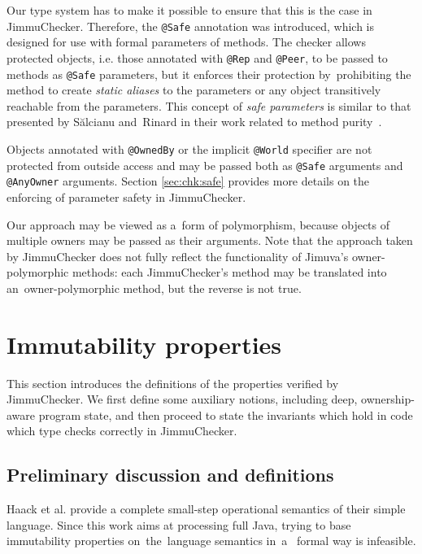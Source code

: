 \documentclass{pracamgr}
\theoremstyle{break}
\theoremstyle{break}
\theoremstyle{break}
\begin{document}
Our type system has to make it possible to ensure that this is the
case in JimmuChecker. Therefore, the \texttt{@Safe} annotation was
introduced, which is designed for use with formal parameters of
methods. The checker allows protected objects, i.e. those annotated
with \texttt{@Rep} and \texttt{@Peer}, to be passed to methods as
\texttt{@Safe} parameters, but it enforces their protection
by~prohibiting the method to create \emph{static aliases} to the
parameters or any object transitively reachable from the
parameters. This concept of \emph{safe parameters} is similar to that
presented by Sălcianu and~Rinard in their work related to method
purity~\cite{purity}.

Objects annotated with \texttt{@OwnedBy} or the implicit
\texttt{@World} specifier are not protected from outside access and
may be passed both as \texttt{@Safe} arguments and \texttt{@AnyOwner}
arguments.  Section \ref{sec:chk:safe} provides more details on the
enforcing of parameter safety in JimmuChecker.

Our approach may be viewed as a~form of polymorphism, because objects
of multiple owners may be passed as their arguments. Note that the
approach taken by JimmuChecker does not fully reflect the
functionality of Jimuva's owner-polymorphic methods: each
JimmuChecker's method may be translated into an~owner-polymorphic
method, but the reverse is not true.

\section{Immutability properties}
\label{sec:properties}

This section introduces the definitions of the properties verified by
JimmuChecker. We first define some auxiliary notions, including deep,
ownership-aware program state, and then proceed to state the
invariants which hold in code which type checks correctly in
JimmuChecker.

\subsection{Preliminary discussion and definitions}

Haack et al. provide a complete small-step operational semantics of
their simple language. Since this work aims at processing full Java,
trying to base immutability properties on~the~language semantics in~a~
formal way is infeasible.
\end{document}
